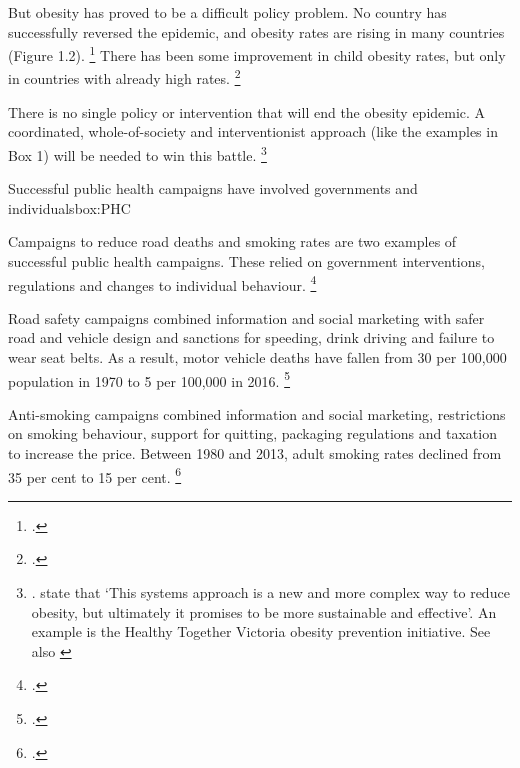 \documentclass[embargoed]{grattan}
\begin{document}
\begin{table}
\caption{Commonwealth government obesity/preventative health reports and committees}\label{tbl:Health-campaigns}



\end{table}


But obesity has proved to be a difficult policy problem.
No country has successfully reversed the epidemic, and obesity rates are rising in many countries (Figure 1.2).%
\footcites{Australia2015NoTimeWeight}{Roberto2015Patchyprogressobesity}{Swinburn2004Dietnutritionprevention} There has been some improvement in child obesity rates, but only in countries with already high rates.%
\footcite{Roberto2015Patchyprogressobesity}

There is no single policy or intervention that will end the obesity epidemic.
A coordinated, whole-of-society and interventionist approach (like the examples in Box 1) will be needed to win this battle.%
\footnote{\textcites{Sassi2016Taxingsugar}{Karnani2016ObesityCrisisas}{Huang2009systemsorientedmultilevel}. \textcite{Swinburn2013Progressobesityprevention} state that `This systems approach is a new and more complex way to reduce obesity, but ultimately it promises to be more sustainable and effective'.
An example is the Healthy Together Victoria obesity prevention initiative.
See also \textcites{Mckinsey2014overcomingobesity}{Health2016Insufficientphysicalactivity}}

\begin{smallbox}{Successful public health campaigns have involved governments and individuals}{box:PHC}

Campaigns to reduce road deaths and smoking rates are two examples of successful public health campaigns.
These relied on government interventions, regulations and changes to individual behaviour.%
\footcite{MacKay2011Legislativesolutionsunhealthy}

Road safety campaigns combined information and social marketing with safer road and vehicle design and sanctions for speeding, drink driving and failure to wear seat belts.
As a result, motor vehicle deaths have fallen from 30 per 100,000 population in 1970 to 5 per 100,000 in 2016.%
\footcites{BITRE2010RoaddeathsAustralia}{BITRE2010RoaddeathsAustralia}

Anti-smoking campaigns combined information and social marketing, restrictions on smoking behaviour, support for quitting, packaging regulations and taxation to increase the price.
Between 1980 and 2013, adult smoking rates declined from 35 per cent to 15 per cent.%
\footcite{Scollo2016TobaccoAustraliaFacts}
\end{smallbox}
\end{document}
